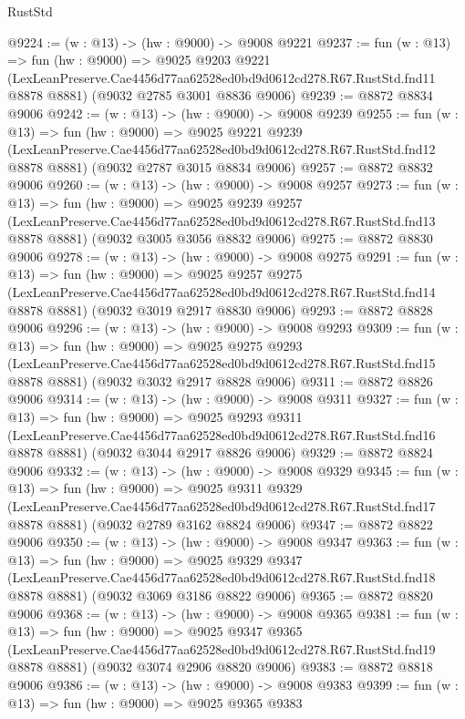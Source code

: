 \begin{lexlean}{RustStd}
\begin{coremodule}
@9224 := (w : @13) -> (hw : @9000) -> @9008 @9221
@9237 := fun (w : @13) =>
  fun (hw : @9000) =>
  @9025
    @9203
    @9221
    (LexLeanPreserve.Cae4456d77aa62528ed0bd9d0612cd278.R67.RustStd.fnd11 @8878 @8881)
    (@9032 @2785 @3001 @8836 @9006)
@9239 := @8872 @8834 @9006
@9242 := (w : @13) -> (hw : @9000) -> @9008 @9239
@9255 := fun (w : @13) =>
  fun (hw : @9000) =>
  @9025
    @9221
    @9239
    (LexLeanPreserve.Cae4456d77aa62528ed0bd9d0612cd278.R67.RustStd.fnd12 @8878 @8881)
    (@9032 @2787 @3015 @8834 @9006)
@9257 := @8872 @8832 @9006
@9260 := (w : @13) -> (hw : @9000) -> @9008 @9257
@9273 := fun (w : @13) =>
  fun (hw : @9000) =>
  @9025
    @9239
    @9257
    (LexLeanPreserve.Cae4456d77aa62528ed0bd9d0612cd278.R67.RustStd.fnd13 @8878 @8881)
    (@9032 @3005 @3056 @8832 @9006)
@9275 := @8872 @8830 @9006
@9278 := (w : @13) -> (hw : @9000) -> @9008 @9275
@9291 := fun (w : @13) =>
  fun (hw : @9000) =>
  @9025
    @9257
    @9275
    (LexLeanPreserve.Cae4456d77aa62528ed0bd9d0612cd278.R67.RustStd.fnd14 @8878 @8881)
    (@9032 @3019 @2917 @8830 @9006)
@9293 := @8872 @8828 @9006
@9296 := (w : @13) -> (hw : @9000) -> @9008 @9293
@9309 := fun (w : @13) =>
  fun (hw : @9000) =>
  @9025
    @9275
    @9293
    (LexLeanPreserve.Cae4456d77aa62528ed0bd9d0612cd278.R67.RustStd.fnd15 @8878 @8881)
    (@9032 @3032 @2917 @8828 @9006)
@9311 := @8872 @8826 @9006
@9314 := (w : @13) -> (hw : @9000) -> @9008 @9311
@9327 := fun (w : @13) =>
  fun (hw : @9000) =>
  @9025
    @9293
    @9311
    (LexLeanPreserve.Cae4456d77aa62528ed0bd9d0612cd278.R67.RustStd.fnd16 @8878 @8881)
    (@9032 @3044 @2917 @8826 @9006)
@9329 := @8872 @8824 @9006
@9332 := (w : @13) -> (hw : @9000) -> @9008 @9329
@9345 := fun (w : @13) =>
  fun (hw : @9000) =>
  @9025
    @9311
    @9329
    (LexLeanPreserve.Cae4456d77aa62528ed0bd9d0612cd278.R67.RustStd.fnd17 @8878 @8881)
    (@9032 @2789 @3162 @8824 @9006)
@9347 := @8872 @8822 @9006
@9350 := (w : @13) -> (hw : @9000) -> @9008 @9347
@9363 := fun (w : @13) =>
  fun (hw : @9000) =>
  @9025
    @9329
    @9347
    (LexLeanPreserve.Cae4456d77aa62528ed0bd9d0612cd278.R67.RustStd.fnd18 @8878 @8881)
    (@9032 @3069 @3186 @8822 @9006)
@9365 := @8872 @8820 @9006
@9368 := (w : @13) -> (hw : @9000) -> @9008 @9365
@9381 := fun (w : @13) =>
  fun (hw : @9000) =>
  @9025
    @9347
    @9365
    (LexLeanPreserve.Cae4456d77aa62528ed0bd9d0612cd278.R67.RustStd.fnd19 @8878 @8881)
    (@9032 @3074 @2906 @8820 @9006)
@9383 := @8872 @8818 @9006
@9386 := (w : @13) -> (hw : @9000) -> @9008 @9383
@9399 := fun (w : @13) =>
  fun (hw : @9000) =>
  @9025
    @9365
    @9383

\end{coremodule}
\end{lexlean}
